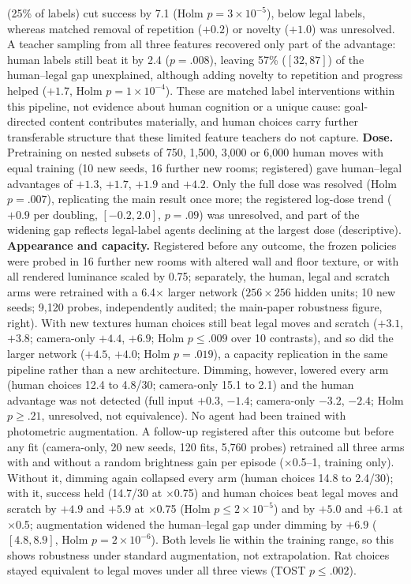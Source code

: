 \documentclass[10pt,onecolumn,letterpaper]{article}
\begin{document}
(25\% of labels) cut success by 7.1 (Holm $p=3\times10^{-5}$), below legal labels, whereas matched removal of
repetition ($+0.2$) or novelty ($+1.0$) was unresolved. A teacher sampling from all three features recovered only
part of the advantage: human labels still beat it by 2.4 ($p=.008$), leaving 57\% ($[32,87]$) of the human--legal gap
unexplained, although adding novelty to repetition and progress helped ($+1.7$, Holm $p=1\times10^{-4}$). These are
matched label interventions within this pipeline, not evidence about human cognition or a unique cause: goal-directed content contributes materially, and human choices carry
further transferable structure that these limited feature teachers do not capture.
\textbf{Dose.} Pretraining on nested subsets of 750, 1,500, 3,000 or 6,000 human moves with equal training (10 new seeds,
16 further new rooms; registered) gave human--legal advantages of $+1.3$, $+1.7$, $+1.9$ and $+4.2$. Only the full dose
was resolved (Holm $p=.007$), replicating the main result once more; the registered log-dose trend ($+0.9$ per doubling,
$[-0.2,2.0]$, $p=.09$) was unresolved, and part of the widening gap reflects legal-label agents declining at the largest
dose (descriptive).
\textbf{Appearance and capacity.} Registered before any outcome, the frozen policies were probed in 16 further new
rooms with altered wall and floor texture, or with all rendered luminance scaled by 0.75; separately, the human,
legal and scratch arms were retrained with a 6.4$\times$ larger network ($256\times256$ hidden units; 10 new seeds;
9,120 probes, independently audited; the main-paper robustness figure, right). With new textures human choices still beat legal
moves and scratch ($+3.1$, $+3.8$; camera-only $+4.4$, $+6.9$; Holm $p\leq.009$ over 10 contrasts), and so did the larger network
($+4.5$, $+4.0$; Holm $p=.019$), a capacity replication in the same pipeline rather than a new architecture.
Dimming, however, lowered every arm (human choices 12.4 to 4.8/30; camera-only 15.1 to 2.1) and the human advantage
was not detected (full input $+0.3$, $-1.4$; camera-only $-3.2$, $-2.4$; Holm $p\geq.21$, unresolved, not equivalence).
No agent had been trained with photometric augmentation. A follow-up registered after this outcome but before any
fit (camera-only, 20 new seeds, 120 fits, 5,760 probes) retrained all three arms with and without a random brightness
gain per episode ($\times$0.5--1, training only). Without it, dimming again collapsed every arm (human choices 14.8
to 2.4/30); with it, success held (14.7/30 at $\times$0.75) and human choices beat legal moves and scratch by $+4.9$
and $+5.9$ at $\times$0.75 (Holm $p\leq2\times10^{-5}$) and by $+5.0$ and $+6.1$ at $\times$0.5; augmentation widened the
human--legal gap under dimming by $+6.9$ ($[4.8,8.9]$, Holm $p=2\times10^{-6}$). Both levels lie within the training
range, so this shows robustness under standard augmentation, not extrapolation.
Rat choices stayed equivalent to legal moves under all three views (TOST $p\leq.002$).
\end{document}
